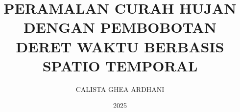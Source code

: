 
\renewcommand{\thechapter}{\Roman{chapter}}
\renewcommand\thesection{\arabic{chapter}.\arabic{section}}
\renewcommand\thesubsection{\thesection.\arabic{subsection}}
\renewcommand{\theequation}{\arabic{chapter}.\arabic{equation}}
\renewcommand{\thefigure}{\arabic{chapter}.\arabic{figure}}
\renewcommand{\thetable}{\arabic{chapter}.\arabic{table}}

\renewcommand\bibname{Daftar Pustaka}
\addto{\captionsindonesian}{\renewcommand{\bibname}{Daftar Pustaka}}


\pagestyle{fancy}
\lhead{}
\chead{}
\rhead{}
\lfoot{}
\cfoot{\thepage}
\rfoot{}
\renewcommand{\headrulewidth}{0pt}


\makeatletter

\title{PERAMALAN CURAH HUJAN DENGAN PEMBOBOTAN DERET WAKTU BERBASIS SPATIO TEMPORAL}
\let\Title\@title
\newcommand{\EngTitle}{RAINFALL FORECASTING USING TIME SERIES WEIGHTING BASED ON SPATIAL TEMPORAL}

\newcommand{\namaMK}{Tugas Akhir}
\newcommand{\kodeMK}{CDK4AAA4}

\author{CALISTA GHEA ARDHANI}
\let\Author\@author
\newcommand{\NIM}{1206220010}
\newcommand{\Alamat}{Jl. Ketintang 156 Surabaya}
\newcommand{\NoHP}{08222222222}
\newcommand{\email}{hamim@student.telkomuniversity.ac.id}
\newcommand{\Prodi}{Sains Data}
\newcommand{\KK}{Smart Computing Technology}
\newcommand{\Gelar}{Sains Data}

\date{2025}
\let\Date\@date
\newcommand{\Tanggal}{22}
\newcommand{\Bulan}{Agustus}

\newcommand{\PembimbingSatu}{Moh.~Hamim~Zajuli~A.,~S.Si.,~M.Mat.}
\newcommand{\NIPPembimbingSatu}{123456}
\newcommand{\PembimbingDua}{Moh.~Hamim~Zajuli~A.,~S.Si.,~M.Mat.}
\newcommand{\NIPPembimbingDua}{123456}

\newcommand{\Kaprodi}{Moh. Hamim Zajuli Al Faroby, S.Si., M.Mat.}
\newcommand{\NIPKaprodi}{23950023-1}

\newif\ifPembimbingHanyaSatu

\makeatother

\linespread{1}